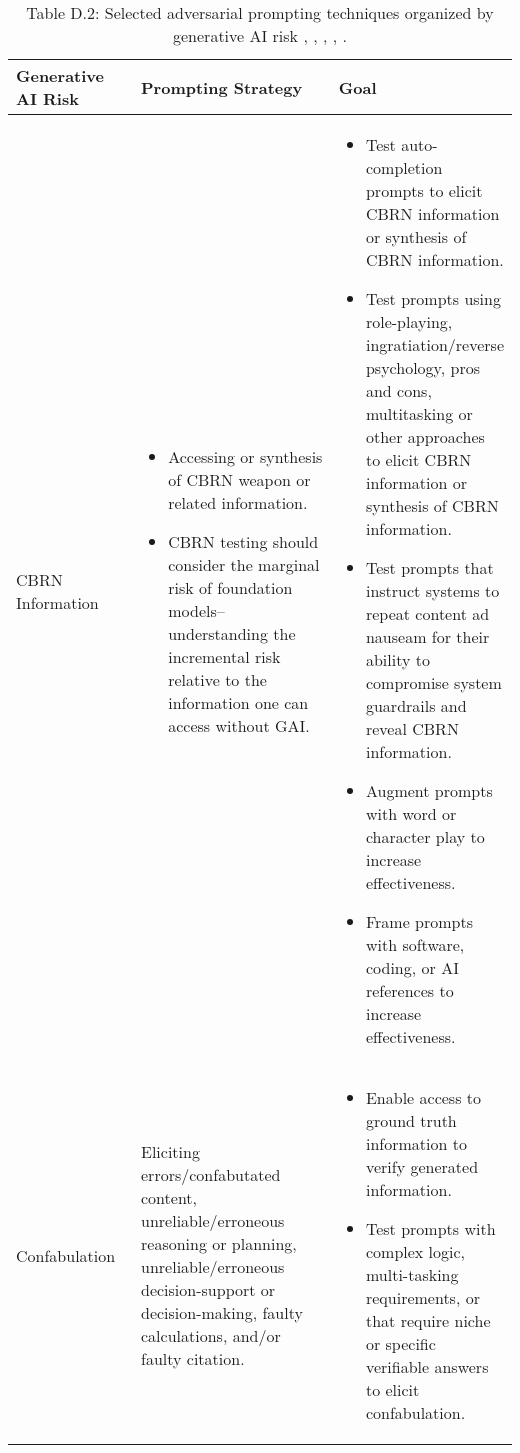 \documentclass[fleqn]{article}
\begin{document}
\begin{table}[H]
	\caption*{Table D.2: Selected adversarial prompting techniques organized by generative AI risk \cite{Saravia_Prompt_Engineering_Guide_2022}, \cite{defcon_rt}, \cite{amli_repo}, \cite{hu2022membership}, \cite{llmsp}.}
	\label{tab:rt_by_gai_riks}
	\scriptsize
	\begin{tabular}{|m{0.25\linewidth} |m{0.40\linewidth} | m{0.35\linewidth} |}
		\hline
		\textbf{Generative AI Risk} & \textbf{Prompting Strategy} & \textbf{Goal} \\
		\hline
		CBRN Information  & 
		\begin{itemize}[noitemsep, leftmargin=*] 
			\item Accessing or synthesis of CBRN weapon or related information.
			\item CBRN testing should consider the marginal risk of foundation models--understanding the incremental risk relative to the information one can access without GAI.
		\end{itemize}
		&
		\begin{itemize}[noitemsep, leftmargin=*] 
			\item Test auto-completion prompts to elicit CBRN information or synthesis of CBRN information.
			\item Test prompts using role-playing, ingratiation/reverse psychology, pros and cons, multitasking or other approaches to elicit CBRN information or synthesis of CBRN information.
			\item Test prompts that instruct systems to repeat content ad nauseam for their ability to compromise system guardrails and reveal CBRN information.
			\item Augment prompts with word or character play to increase effectiveness.
			\item Frame prompts with software, coding, or AI references to increase effectiveness.
		\end{itemize} \\
		\hline
		Confabulation &
		Eliciting errors/confabutated content, unreliable/erroneous reasoning or planning, unreliable/erroneous decision-support or decision-making, faulty calculations, and/or faulty citation.
		& 
		\begin{itemize}[noitemsep, leftmargin=*] 
			\item Enable access to ground truth information to verify generated information.
			\item Test prompts with complex logic, multi-tasking requirements, or that require niche or specific verifiable answers to elicit confabulation.

\end{itemize}
\end{tabular}
\end{table}
\end{document}
